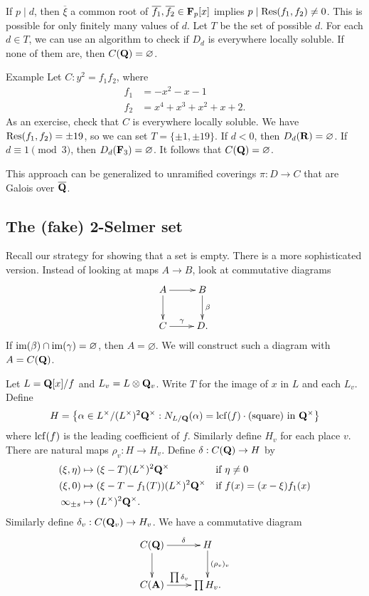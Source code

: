 If $p\mid d$, then $\overline\xi$ a common root of 
$\overline{f_1},\overline{f_2}\in \mathbf{F}_p[x]$ implies 
$p\mid \operatorname{Res}(f_1,f_2)\ne 0$. This is possible for only finitely many 
values of $d$. Let $T$ be the set of possible $d$. For each $d\in T$, we can 
use an algorithm to check if $D_d$ is everywhere locally soluble. If none of 
them are, then $C(\mathbf{Q})=\varnothing$. 

\begin{enonce}[remark]{Example}
Let $C:y^2=f_1 f_2$, where 
\begin{align*}
  f_1 &= -x^2-x-1 \\
  f_2 &= x^4 + x^3 + x^2 + x+2 .
\end{align*}
As an exercise, check that $C$ is everywhere locally soluble. We have 
$\operatorname{Res}(f_1,f_2)=\pm 19$, so we can set $T=\{\pm 1,\pm 19\}$. If 
$d<0$, then $D_d(\mathbf{R})=\varnothing$. If $d\equiv 1\pmod 3$, then 
$D_d(\mathbf{F}_3)=\varnothing$. It follows that $C(\mathbf{Q})=\varnothing$. 
\end{enonce}

This approach can be generalized to unramified coverings $\pi:D\to C$ that are 
Galois over $\overline{\mathbf{Q}}$. 





\subsection{The (fake) 2-Selmer set}

Recall our strategy for showing that a set is empty. There is a more 
sophisticated version. Instead of looking at maps $A\to B$, look at 
commutative diagrams 
\[\xymatrix{
  A \ar[r] \ar[d] 
    & B \ar[d]^-\beta \\
  C \ar[r]^-\gamma 
    & D .
}\]
If $\operatorname{im}(\beta)\cap \operatorname{im}(\gamma)=\varnothing$, then $A=\varnothing$. We 
will construct such a diagram with $A=C(\mathbf{Q})$. 

Let $L=\mathbf{Q}[x]/f$ and $L_v=L\otimes \mathbf{Q}_v$. Write $T$ for the image of $x$ in 
$L$ and each $L_v$. Define 
\[
  H = \left\{\alpha\in L^\times/(L^\times)^2 \mathbf{Q}^\times:N_{L/\mathbf{Q}}(\alpha) = \operatorname{lcf}(f)\cdot (\text{square})\text{ in }\mathbf{Q}^\times\right\}
\]
where $\operatorname{lcf}(f)$ is the leading coefficient of $f$. Similarly 
define $H_v$ for each place $v$. There are natural maps $\rho_v:H\to H_v$. 
Define $\delta:C(\mathbf{Q}) \to H$ by 
\begin{align*}
  (\xi,\eta) &\mapsto (\xi-T) (L^\times)^2 \mathbf{Q}^\times && \text{if }\eta\ne 0 \\
  (\xi,0) &\mapsto (\xi-T-f_1(T))(L^\times)^2 \mathbf{Q}^\times && \text{if }f(x)=(x-\xi)f_1(x) \\
  \infty_{\pm s} &\mapsto (L^\times)^2 \mathbf{Q}^\times .
\end{align*} 
Similarly define $\delta_v:C(\mathbf{Q}_v)\to H_v$. We have a commutative diagram 
\[\xymatrix{
  C(\dQ) \ar[r]^-\delta \ar[d] 
    & H \ar[d]^-{(\rho_v)_v} \\
  C(\dA) \ar[r]^-{\prod \delta_v} 
    & \prod H_v .
}\]

